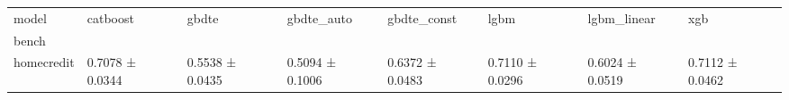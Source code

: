 \begin{tabular}{llllllll}
\toprule
model & catboost & gbdte & gbdte_auto & gbdte_const & lgbm & lgbm_linear & xgb \\
bench &  &  &  &  &  &  &  \\
\midrule
homecredit & 0.7078 ± 0.0344 & 0.5538 ± 0.0435 & 0.5094 ± 0.1006 & 0.6372 ± 0.0483 & 0.7110 ± 0.0296 & 0.6024 ± 0.0519 & 0.7112 ± 0.0462 \\
\bottomrule
\end{tabular}
